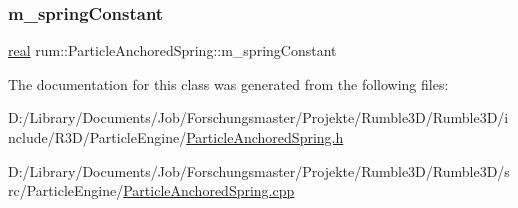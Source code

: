 \mbox{\label{classrum_1_1_particle_anchored_spring_a1f5b5cc0af0815b1d7d9902c515f9ed8}} 
\subsubsection{\texorpdfstring{m\+\_\+spring\+Constant}{m\_springConstant}}
{\footnotesize\ttfamily \mbox{\hyperlink{namespacerum_a7e8cca23573d5eaead0f138cbaa4862c}{real}} rum\+::\+Particle\+Anchored\+Spring\+::m\+\_\+spring\+Constant\hspace{0.3cm}{\ttfamily [protected]}}



The documentation for this class was generated from the following files\+:\begin{DoxyCompactItemize}
\item 
D\+:/\+Library/\+Documents/\+Job/\+Forschungsmaster/\+Projekte/\+Rumble3\+D/\+Rumble3\+D/include/\+R3\+D/\+Particle\+Engine/\mbox{\hyperlink{_particle_anchored_spring_8h}{Particle\+Anchored\+Spring.\+h}}\item 
D\+:/\+Library/\+Documents/\+Job/\+Forschungsmaster/\+Projekte/\+Rumble3\+D/\+Rumble3\+D/src/\+Particle\+Engine/\mbox{\hyperlink{_particle_anchored_spring_8cpp}{Particle\+Anchored\+Spring.\+cpp}}\end{DoxyCompactItemize}
